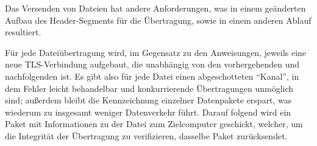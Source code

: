 Das Versenden von Dateien hat andere Anforderungen, was in einem geänderten Aufbau des Header-Segments für die Übertragung, sowie in einem anderen Ablauf resultiert.\par
Für jede Dateiübertragung wird, im Gegensatz zu den Anweisungen, jeweils eine neue TLS-Verbindung aufgebaut, die unabhängig von den vorhergehenden und nachfolgenden ist. Es gibt also für jede Datei einen abgeschotteten "`Kanal"', in dem Fehler leicht behandelbar und konkurrierende Übertragungen unmöglich sind; außerdem bleibt die Kennzeichnung einzelner Datenpakete erspart, was wiederum zu insgesamt weniger Datenverkehr führt.
Darauf folgend wird ein Paket mit Informationen zu der Datei zum Zielcomputer geschickt, welcher, um die Integrität der Übertragung zu verifizieren, dasselbe Paket zurücksendet.\\

